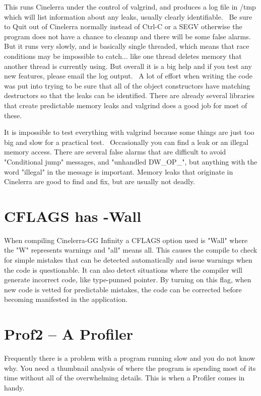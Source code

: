 This runs Cinelerra under the control of valgrind, and produces a log file in /tmp which will list information about any leaks, usually clearly identifiable. \ Be sure to Quit out of Cinelerra normally instead of Ctrl-C or a SEGV otherwise the program does not have a chance to cleanup and there will be some false alarms. But it runs very slowly, and is basically single threaded, which means that race conditions may be impossible to catch... like one thread deletes memory that another thread is currently using. But overall it is a big help and if you test any new features, please email the log output. \ A lot of effort when writing the code was put into trying to be sure that all of the object constructors have matching destructors so that the leaks can be identified. There are already several libraries that create predictable memory leaks and valgrind does a good job for most of these.
\medskip

It is impossible to test everything with valgrind because some things are just too big and slow for a practical test. \ Occasionally you can find a leak or an illegal memory access. There are several false alarms that are difficult to avoid "Conditional jump" messages, and "unhandled DW\_OP\_", but anything with the word "illegal" in the message is important. Memory leaks that originate in Cinelerra are good to find and fix, but are usually not deadly.

\section{CFLAGS has -Wall}
\label{sec:CFLAGS has -Wall}
When compiling Cinelerra-GG Infinity a CFLAGS option used is "Wall" where the "W" represents warnings and "all" means all.  This causes the compile to check for simple mistakes that can be detected automatically and issue warnings when the code is questionable.  It can also detect situations where the compiler will generate incorrect code, like type-punned pointer.  By turning on this flag, when new code is vetted for predictable mistakes, the code can be corrected before becoming manifested in the application.

\section{Prof2 -- A Profiler}
\label{sec:Prof2 -- A Profiler}

Frequently there is a problem with a program running slow and you do not know why. You need a thumbnail analysis of where the program is spending most of its time without all of the overwhelming details. This is when a Profiler comes in handy.
\medskip

